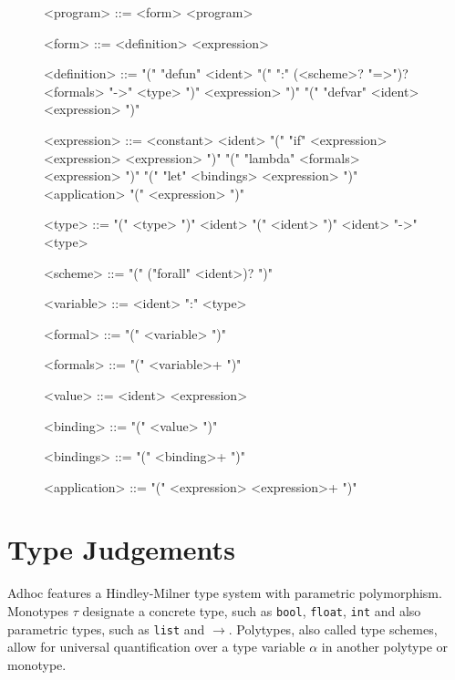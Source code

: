 \documentclass[11pt,a4paper]{article}
\begin{document}
\begin{figure}[H]
\small
\setlength{\grammarindent}{8em}
\renewcommand{\grammarlabel}[2]{\synt{#1}\hfill#2}
\begin{grammar}
<program> ::= <form> <program>

<form> ::= <definition>
    \alt <expression>

<definition> ::= "(" "defun" <ident> "(" ":" (<scheme>? "=>")? <formals> "->" <type> ")" <expression> ")"
    \alt "(" "defvar" <ident> <expression> ")"



<expression> ::= <constant>
    \alt <ident>
    \alt "(" "if" <expression> <expression> <expression> ")"
    \alt "(" "lambda" <formals> <expression> ")"
    \alt "(" "let" <bindings> <expression> ")"
    \alt <application>
    \alt "(" <expression> ")"

<type> ::= "(" <type> ")"
    \alt <ident>
    \alt "(" <ident> ")"
    \alt <ident> "->" <type>

<scheme> ::= "(" ("forall" <ident>)? ")"

<variable> ::= <ident> ":" <type>

<formal> ::= "(" <variable> ")"

<formals> ::= "(" <variable>+ ")"

<value> ::= <ident> <expression>

<binding> ::= "(" <value> ")"

<bindings> ::= "(" <binding>+ ")"

<application> ::= "(" <expression> <expression>+ ")"
\end{grammar}
\end{figure}



\section{Type Judgements}

Adhoc features a Hindley-Milner type system with parametric polymorphism.
Monotypes $\tau$ designate a concrete type, such as \verb|bool|, \verb|float|,
\verb|int| and also parametric types, such as \verb|list| and $\rightarrow$.
Polytypes, also called type schemes, allow for universal quantification over
a type variable $\alpha$ in another polytype or monotype.
\end{document}
